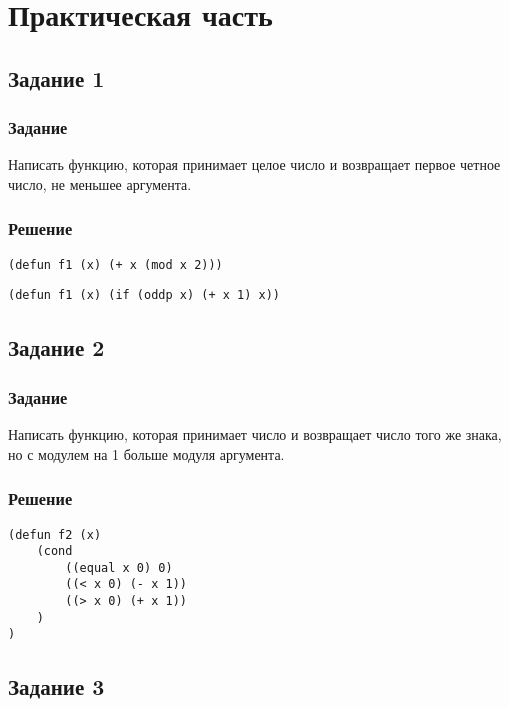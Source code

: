 \newpage

\chapter{Практическая часть}
\section{Задание 1}
\subsection*{Задание}
Написать функцию, которая принимает целое число и возвращает первое четное число, не меньшее аргумента.

\subsection*{Решение}
\begin{code}
\begin{verbatim}
(defun f1 (x) (+ x (mod x 2)))
\end{verbatim}
\end{code}

\begin{code}
\begin{verbatim}
(defun f1 (x) (if (oddp x) (+ x 1) x))
\end{verbatim}
\end{code}


\section{Задание 2}
\subsection*{Задание}
Написать функцию, которая принимает число и возвращает число того же знака, но с модулем на 1 больше модуля аргумента.

\subsection*{Решение}
\begin{code}
\begin{verbatim}
(defun f2 (x)
	(cond
		((equal x 0) 0)
		((< x 0) (- x 1))
		((> x 0) (+ x 1))
	)
)
\end{verbatim}
\end{code}


\section{Задание 3}
